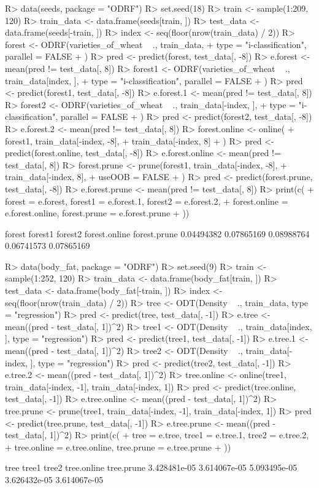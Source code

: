 \documentclass[nojss]{jss}
\numberwithin{equation}{section}
\begin{document}
\begin{Schunk}
\begin{Sinput}
R> data(seeds, package = "ODRF")
R> set.seed(18)
R> train <- sample(1:209, 120)
R> train_data <- data.frame(seeds[train, ])
R> test_data <- data.frame(seeds[-train, ])
R> index <- seq(floor(nrow(train_data) / 2))
R> forest <- ODRF(varieties_of_wheat ~ ., train_data,
+    type = "i-classification", parallel = FALSE
+  )
R> pred <- predict(forest, test_data[, -8])
R> e.forest <- mean(pred != test_data[, 8])
R> forest1 <- ODRF(varieties_of_wheat ~ ., train_data[index, ],
+    type = "i-classification", parallel = FALSE
+  )
R> pred <- predict(forest1, test_data[, -8])
R> e.forest.1 <- mean(pred != test_data[, 8])
R> forest2 <- ODRF(varieties_of_wheat ~ ., train_data[-index, ],
+    type = "i-classification", parallel = FALSE
+  )
R> pred <- predict(forest2, test_data[, -8])
R> e.forest.2 <- mean(pred != test_data[, 8])
R> forest.online <- online(
+    forest1, train_data[-index, -8],
+    train_data[-index, 8]
+  )
R> pred <- predict(forest.online, test_data[, -8])
R> e.forest.online <- mean(pred != test_data[, 8])
R> forest.prune <- prune(forest1, train_data[-index, -8],
+    train_data[-index, 8],
+    useOOB = FALSE
+  )
R> pred <- predict(forest.prune, test_data[, -8])
R> e.forest.prune <- mean(pred != test_data[, 8])
R> print(c(
+    forest = e.forest, forest1 = e.forest.1, forest2 = e.forest.2,
+    forest.online = e.forest.online, forest.prune = e.forest.prune
+  ))
\end{Sinput}
\begin{Soutput}
       forest       forest1       forest2 forest.online  forest.prune 
   0.04494382    0.07865169    0.08988764    0.06741573    0.07865169 
\end{Soutput}
\begin{Sinput}
R> data(body_fat, package = "ODRF")
R> set.seed(9)
R> train <- sample(1:252, 120)
R> train_data <- data.frame(body_fat[train, ])
R> test_data <- data.frame(body_fat[-train, ])
R> index <- seq(floor(nrow(train_data) / 2))
R> tree <- ODT(Density ~ ., train_data, type = "regression")
R> pred <- predict(tree, test_data[, -1])
R> e.tree <- mean((pred - test_data[, 1])^2)
R> tree1 <- ODT(Density ~ ., train_data[index, ], type = "regression")
R> pred <- predict(tree1, test_data[, -1])
R> e.tree.1 <- mean((pred - test_data[, 1])^2)
R> tree2 <- ODT(Density ~ ., train_data[-index, ], type = "regression")
R> pred <- predict(tree2, test_data[, -1])
R> e.tree.2 <- mean((pred - test_data[, 1])^2)
R> tree.online <- online(tree1, train_data[-index, -1], train_data[-index, 1])
R> pred <- predict(tree.online, test_data[, -1])
R> e.tree.online <- mean((pred - test_data[, 1])^2)
R> tree.prune <- prune(tree1, train_data[-index, -1], train_data[-index, 1])
R> pred <- predict(tree.prune, test_data[, -1])
R> e.tree.prune <- mean((pred - test_data[, 1])^2)
R> print(c(
+    tree = e.tree, tree1 = e.tree.1, tree2 = e.tree.2,
+    tree.online = e.tree.online, tree.prune = e.tree.prune
+  ))
\end{Sinput}
\begin{Soutput}
        tree        tree1        tree2  tree.online   tree.prune 
3.428481e-05 3.614067e-05 5.093495e-05 3.626432e-05 3.614067e-05 
\end{Soutput}
\end{Schunk}
\end{document}
